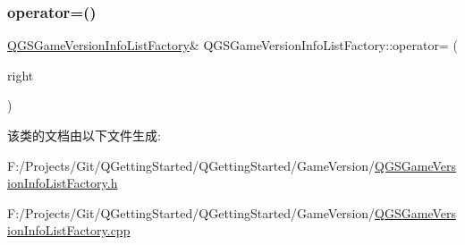 \mbox{\label{class_q_g_s_game_version_info_list_factory_afbc59287f1b317d10d25b1804e085ed2}} 
\subsubsection{\texorpdfstring{operator=()}{operator=()}\hspace{0.1cm}{\footnotesize\ttfamily [2/2]}}
{\footnotesize\ttfamily \mbox{\hyperlink{class_q_g_s_game_version_info_list_factory}{Q\+G\+S\+Game\+Version\+Info\+List\+Factory}}\& Q\+G\+S\+Game\+Version\+Info\+List\+Factory\+::operator= (\begin{DoxyParamCaption}\item[{\mbox{\hyperlink{class_q_g_s_game_version_info_list_factory}{Q\+G\+S\+Game\+Version\+Info\+List\+Factory}} \&\&}]{right }\end{DoxyParamCaption})\hspace{0.3cm}{\ttfamily [delete]}}



该类的文档由以下文件生成\+:\begin{DoxyCompactItemize}
\item 
F\+:/\+Projects/\+Git/\+Q\+Getting\+Started/\+Q\+Getting\+Started/\+Game\+Version/\mbox{\hyperlink{_q_g_s_game_version_info_list_factory_8h}{Q\+G\+S\+Game\+Version\+Info\+List\+Factory.\+h}}\item 
F\+:/\+Projects/\+Git/\+Q\+Getting\+Started/\+Q\+Getting\+Started/\+Game\+Version/\mbox{\hyperlink{_q_g_s_game_version_info_list_factory_8cpp}{Q\+G\+S\+Game\+Version\+Info\+List\+Factory.\+cpp}}\end{DoxyCompactItemize}
